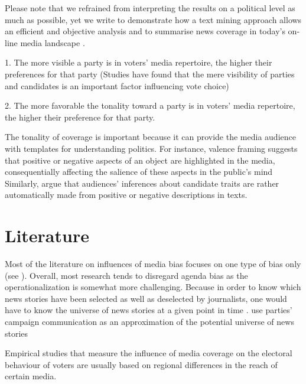 \documentclass[12pt,a4paper,notitlepage]{article}
\begin{document}


Please note that we refrained from interpreting the results on a political level as much as possible, yet we write to demonstrate how a text mining approach allows an efficient and objective analysis and to summarise news coverage in today’s on-line media landscape \citep{junque_de_fortuny_media_2012}. 

1. The more visible a party is in voters' media repertoire, the higher their preferences for that party (Studies have found that the mere visibility of parties and candidates is an important factor influencing vote choice)

2. The more favorable the tonality toward a party is in voters' media repertoire, the higher their preference for that party.

The tonality of coverage is important because it can provide the media audience with templates for understanding politics. For instance, valence framing suggests that positive or negative aspects of an object are highlighted in the media, consequentially affecting the salience of these aspects in the public's mind \citep{de_vreese_valenced_2006}  Similarly, \citet{druckman_impact_2005} argue that audiences' inferences about candidate traits are rather automatically made from positive or negative descriptions in texts.


\section{Literature}

Most of the literature on influences of media bias focuses on one type of bias only (see \citet{eberl_one_2017}). Overall, most research tends to disregard agenda bias as the operationalization is somewhat more challenging. Because in order to know which news stories have been selected as well as deselected by journalists, one would have to know the universe of news stories at a given point in time \citet{dalessio_media_2000}. \citet{eberl_one_2017} use parties' campaign communication as an approximation of the potential universe of news stories \citep{brandenburg_political_2005}


Empirical studies that measure the influence of media coverage on the electoral behaviour of voters are usually based on regional differences in the reach of certain media.  
\end{document}
